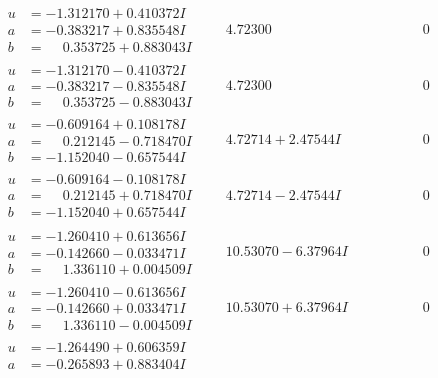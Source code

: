 \documentclass[1p]{elsarticle_modified}
\theoremstyle{definition}
\begin{document}
$$\begin{array}{c|c|c}
 \hline 
\begin{aligned}
u &= -1.312170 + 0.410372 I \\
a &= -0.383217 + 0.835548 I \\
b &= \phantom{-}0.353725 + 0.883043 I\end{aligned}
 & \phantom{-}4.72300\phantom{ +0.000000I} & \phantom{-0.000000 } 0 \\ \hline\begin{aligned}
u &= -1.312170 - 0.410372 I \\
a &= -0.383217 - 0.835548 I \\
b &= \phantom{-}0.353725 - 0.883043 I\end{aligned}
 & \phantom{-}4.72300\phantom{ +0.000000I} & \phantom{-0.000000 } 0 \\ \hline\begin{aligned}
u &= -0.609164 + 0.108178 I \\
a &= \phantom{-}0.212145 - 0.718470 I \\
b &= -1.152040 - 0.657544 I\end{aligned}
 & \phantom{-}4.72714 + 2.47544 I & \phantom{-0.000000 } 0 \\ \hline\begin{aligned}
u &= -0.609164 - 0.108178 I \\
a &= \phantom{-}0.212145 + 0.718470 I \\
b &= -1.152040 + 0.657544 I\end{aligned}
 & \phantom{-}4.72714 - 2.47544 I & \phantom{-0.000000 } 0 \\ \hline\begin{aligned}
u &= -1.260410 + 0.613656 I \\
a &= -0.142660 - 0.033471 I \\
b &= \phantom{-}1.336110 + 0.004509 I\end{aligned}
 & \phantom{-}10.53070 - 6.37964 I & \phantom{-0.000000 } 0 \\ \hline\begin{aligned}
u &= -1.260410 - 0.613656 I \\
a &= -0.142660 + 0.033471 I \\
b &= \phantom{-}1.336110 - 0.004509 I\end{aligned}
 & \phantom{-}10.53070 + 6.37964 I & \phantom{-0.000000 } 0 \\ \hline\begin{aligned}
u &= -1.264490 + 0.606359 I \\
a &= -0.265893 + 0.883404 I \\

\end{aligned}
\end{array}$$
\end{document}
